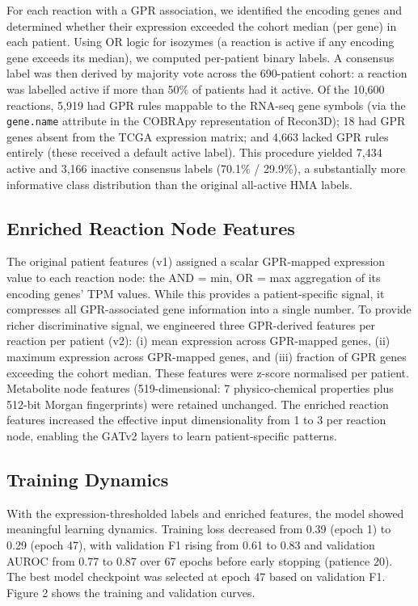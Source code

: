\documentclass[12pt,a4paper]{article}
\begin{document}
For each reaction with a GPR association, we identified the encoding genes and determined whether their expression exceeded the cohort median (per gene) in each patient. Using OR logic for isozymes (a reaction is active if any encoding gene exceeds its median), we computed per-patient binary labels. A consensus label was then derived by majority vote across the 690-patient cohort: a reaction was labelled active if more than 50\% of patients had it active. Of the 10,600 reactions, 5,919 had GPR rules mappable to the RNA-seq gene symbols (via the \texttt{gene.name} attribute in the COBRApy representation of Recon3D); 18 had GPR genes absent from the TCGA expression matrix; and 4,663 lacked GPR rules entirely (these received a default active label). This procedure yielded 7,434 active and 3,166 inactive consensus labels (70.1\% / 29.9\%), a substantially more informative class distribution than the original all-active HMA labels.

\subsection{Enriched Reaction Node Features}

The original patient features (v1) assigned a scalar GPR-mapped expression value to each reaction node: the AND = min, OR = max aggregation of its encoding genes' TPM values. While this provides a patient-specific signal, it compresses all GPR-associated gene information into a single number. To provide richer discriminative signal, we engineered three GPR-derived features per reaction per patient (v2): (i) mean expression across GPR-mapped genes, (ii) maximum expression across GPR-mapped genes, and (iii) fraction of GPR genes exceeding the cohort median. These features were z-score normalised per patient. Metabolite node features (519-dimensional: 7 physico-chemical properties plus 512-bit Morgan fingerprints) were retained unchanged. The enriched reaction features increased the effective input dimensionality from 1 to 3 per reaction node, enabling the GATv2 layers to learn patient-specific patterns.

\subsection{Training Dynamics}

With the expression-thresholded labels and enriched features, the model showed meaningful learning dynamics. Training loss decreased from 0.39 (epoch 1) to 0.29 (epoch 47), with validation F1 rising from 0.61 to 0.83 and validation AUROC from 0.77 to 0.87 over 67 epochs before early stopping (patience 20). The best model checkpoint was selected at epoch 47 based on validation F1. Figure 2 shows the training and validation curves.
\end{document}
